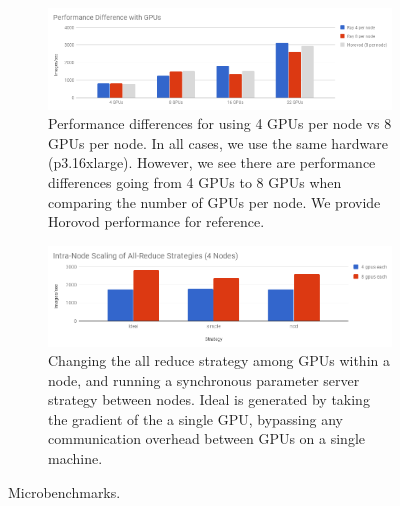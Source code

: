 \begin{figure}
\begin{subfigure}{0.45\textwidth}
\includegraphics[width=1\textwidth]{fig/4to8.png}
    \caption{
    \small{
        Performance differences for using 4 GPUs per node vs 8 GPUs per node. In all cases, we use the same hardware (p3.16xlarge). However, we see there are performance differences going from 4 GPUs to 8 GPUs when comparing the number of GPUs per node. We provide Horovod performance for reference.
    }
    }
    \label{fig:8-vs-4-gpu}
\end{subfigure}\hspace{\fill}
\begin{subfigure}{0.45\textwidth}
\includegraphics[width=1\textwidth]{fig/intranode.png}
    \caption{ \small{ Changing the all reduce strategy among GPUs within a node,
        and running a synchronous parameter server strategy between nodes. Ideal
        is generated by taking the gradient of the a single GPU, bypassing any
        communication overhead between GPUs on a single machine.  } }

    \label{fig:intra-node-allreduce-strategy}
\end{subfigure}
\caption{Microbenchmarks.}

\end{figure}
